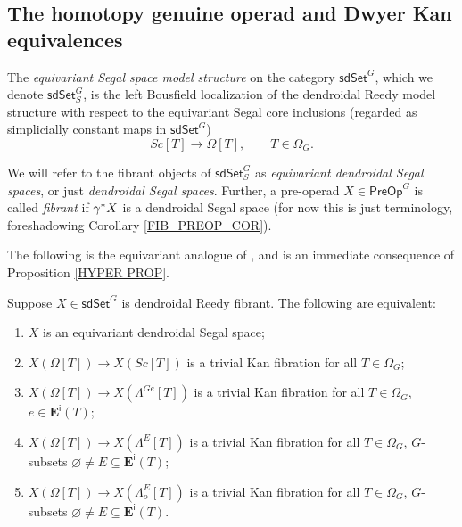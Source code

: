 \documentclass[a4paper,10pt
 ,draft
]{article}%
\begin{document}
\subsection{The homotopy genuine operad and Dwyer Kan equivalences}\label{HMPTYGEN SEC}


\begin{definition}
	The \textit{equivariant Segal space model structure} on the category $\mathsf{sdSet}^G$, which we denote 
	$\mathsf{sdSet}^G_S$, 
	is the left Bousfield localization of the dendroidal Reedy model structure with respect to the equivariant Segal core inclusions 
	(regarded as simplicially constant maps in $\mathsf{sdSet}^G$)
\[
	Sc[T] \to \Omega[T], \qquad T \in \Omega_G.
\]
\end{definition}


\begin{notation}\label{FIB_PREOP_NOT}
We will refer to the fibrant objects of
$\mathsf{sdSet}^G_S$
as \textit{equivariant dendroidal Segal spaces}, 
or just \textit{dendroidal Segal spaces}.
Further, a pre-operad $X \in \mathsf{PreOp}^G$ is called \textit{fibrant}
if $\gamma^{\**}X$ is a dendroidal Segal space
(for now this is just terminology,
foreshadowing Corollary \ref{FIB_PREOP_COR}).
\end{notation}

The following is the equivariant analogue of \cite[Cor. 5.6]{CM13a}, and is an immediate consequence of Proposition \ref{HYPER PROP}.
\begin{proposition}
      \label{DSSCHAR_PROP}
      Suppose $X \in \mathsf{sdSet}^G$ is dendroidal Reedy fibrant. The following are equivalent:
      \begin{enumerate}[label = (\roman*)]
      \item $X$ is an equivariant dendroidal Segal space;
      \item $X(\Omega[T]) \to X(Sc[T])$ is a trivial Kan fibration for all $T \in \Omega_G$;
	\item $X(\Omega[T]) \to X(\Lambda^{Ge}[T])$ is a trivial Kan fibration for all $T \in \Omega_G$, $e \in \boldsymbol E^{\mathsf{i}}(T)$;
      \item $X(\Omega[T]) \to X(\Lambda^E[T])$ is a trivial Kan fibration for all $T \in \Omega_G$, $G$-subsets $\varnothing \neq E \subseteq \boldsymbol E^{\mathsf{i}}(T)$;
      \item $X(\Omega[T]) \to X(\Lambda_o^E[T])$ is a trivial Kan fibration for all $T \in \Omega_G$, $G$-subsets $\varnothing \neq E \subseteq \boldsymbol E^{\mathsf{i}}(T)$.
      \end{enumerate}
\end{proposition}
\end{document}
